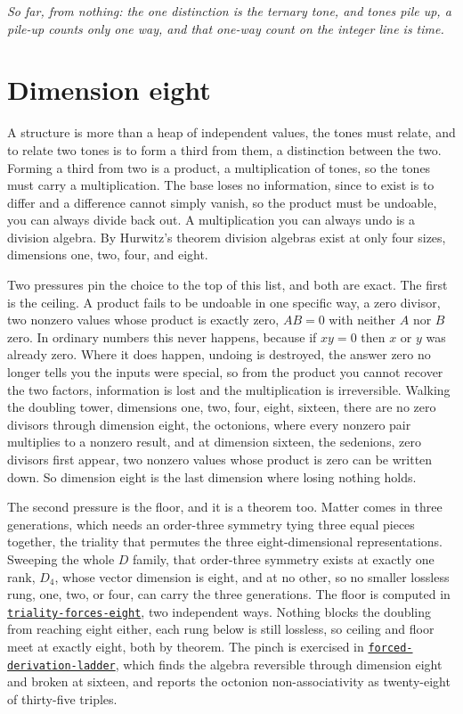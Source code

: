 \documentclass{article}
\newcommand{\code}[2]{\href{https://github.com/cluesurf/vibe/blob/make/#1}{\texttt{#2}}}
\begin{document}
\emph{So far, from nothing: the one distinction is the ternary tone, and tones pile up, a pile-up
counts only one way, and that one-way count on the integer line is time.}

\section{Dimension eight}

A structure is more than a heap of independent values, the tones must relate, and to relate two
tones is to form a third from them, a distinction between the two. Forming a third from two is a
product, a multiplication of tones, so the tones must carry a multiplication. The base loses no
information, since to exist is to differ and a difference cannot simply vanish, so the product
must be undoable, you can always divide back out. A multiplication you can always undo is a
division algebra. By Hurwitz's theorem division algebras exist at only four sizes, dimensions
one, two, four, and eight.

Two pressures pin the choice to the top of this list, and both are exact. The first is the
ceiling. A product fails to be undoable in one specific way, a zero divisor, two nonzero values
whose product is exactly zero, $A B = 0$ with neither $A$ nor $B$ zero. In ordinary numbers this
never happens, because if $xy = 0$ then $x$ or $y$ was already zero. Where it does happen, undoing
is destroyed, the answer zero no longer tells you the inputs were special, so from the product you
cannot recover the two factors, information is lost and the multiplication is irreversible.
Walking the doubling tower, dimensions one, two, four, eight, sixteen, there are no zero divisors
through dimension eight, the octonions, where every nonzero pair multiplies to a nonzero result,
and at dimension sixteen, the sedenions, zero divisors first appear, two nonzero values whose
product is zero can be written down. So dimension eight is the last dimension where losing nothing
holds.

The second pressure is the floor, and it is a theorem too. Matter comes in three generations,
which needs an order-three symmetry tying three equal pieces together, the triality that permutes
the three eight-dimensional representations. Sweeping the whole $D$ family, that order-three
symmetry exists at exactly one rank, $D_4$, whose vector dimension is eight, and at no other, so
no smaller lossless rung, one, two, or four, can carry the three generations. The floor is
computed in \code{test/experiment/foundations/triality-forces-eight.ts}{triality-forces-eight},
two independent ways. Nothing blocks the doubling from reaching eight either, each rung below is
still lossless, so ceiling and floor meet at exactly eight, both by theorem. The pinch is
exercised in
\code{test/experiment/foundations/forced-derivation-ladder.ts}{forced-derivation-ladder}, which
finds the algebra reversible through dimension eight and broken at sixteen, and reports the
octonion non-associativity as twenty-eight of thirty-five triples.
\end{document}
